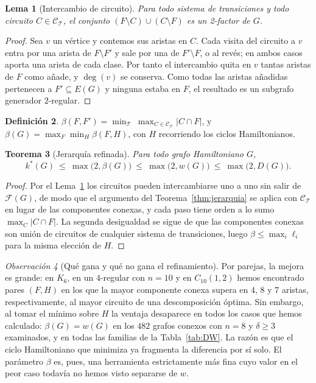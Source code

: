 \documentclass[11pt,a4paper]{article}
\newtheorem{teorema}{Teorema}[section]
\newtheorem{lema}[teorema]{Lema}
\theoremstyle{definition}
\newtheorem{definicion}[teorema]{Definición}
\theoremstyle{remark}
\newtheorem{observacion}[teorema]{Observación}
\begin{document}
\begin{lema}[Intercambio de circuito]\label{lem:toggle}
Para todo sistema de transiciones y todo circuito $C\in\mathcal{C}_{\mathcal T}$, el conjunto $(F\setminus C)\cup(C\setminus F)$ es un 2-factor de $G$.
\end{lema}

\begin{proof}
Sea $v$ un vértice y contemos sus aristas en $C$. Cada visita del circuito a $v$ entra por una arista de $F\setminus F'$ y sale por una de $F'\setminus F$, o al revés; en ambos casos aporta una arista de cada clase. Por tanto el intercambio quita en $v$ tantas aristas de $F$ como añade, y $\deg(v)$ se conserva. Como todas las aristas añadidas pertenecen a $F'\subseteq E(G)$ y ninguna estaba en $F$, el resultado es un subgrafo generador $2$-regular.
\end{proof}

\begin{definicion}
$\displaystyle \beta(F,F')=\min_{\mathcal T}\ \max_{C\in\mathcal{C}_{\mathcal T}}|C\cap F|$, y $\displaystyle \beta(G)=\max_{F}\min_{H}\beta(F,H)$, con $H$ recorriendo los ciclos Hamiltonianos.
\end{definicion}

\begin{teorema}[Jerarquía refinada]\label{thm:jerarquia2}
Para todo grafo Hamiltoniano $G$,
\[
k^*(G)\ \le\ \max\big(2,\beta(G)\big)\ \le\ \max\big(2,w(G)\big)\ \le\ \max\big(2,D(G)\big).
\]
\end{teorema}

\begin{proof}
Por el Lema~\ref{lem:toggle} los circuitos pueden intercambiarse uno a uno sin salir de $\mathcal{F}(G)$, de modo que el argumento del Teorema~\ref{thm:jerarquia} se aplica con $\mathcal{C}_{\mathcal T}$ en lugar de las componentes conexas, y cada paso tiene orden a lo sumo $\max_C|C\cap F|$. La segunda desigualdad se sigue de que las componentes conexas son unión de circuitos de cualquier sistema de transiciones, luego $\beta\le\max_i\ell_i$ para la misma elección de $H$.
\end{proof}

\begin{observacion}[Qué gana y qué no gana el refinamiento]\label{obs:beta}
Por parejas, la mejora es grande: en $K_6$, en un $4$-regular con $n=10$ y en $C_{10}(1,2)$ hemos encontrado pares $(F,H)$ en los que la mayor componente conexa supera en $4$, $8$ y $7$ aristas, respectivamente, al mayor circuito de una descomposición óptima. Sin embargo, al tomar el mínimo sobre $H$ la ventaja desaparece en todos los casos que hemos calculado: $\beta(G)=w(G)$ en los $482$ grafos conexos con $n=8$ y $\delta\ge3$ examinados, y en todas las familias de la Tabla~\ref{tab:DW}. La razón es que el ciclo Hamiltoniano que minimiza ya fragmenta la diferencia por sí solo. El parámetro $\beta$ es, pues, una herramienta estrictamente más fina cuyo valor en el peor caso todavía no hemos visto separarse de $w$.
\end{observacion}
\end{document}
